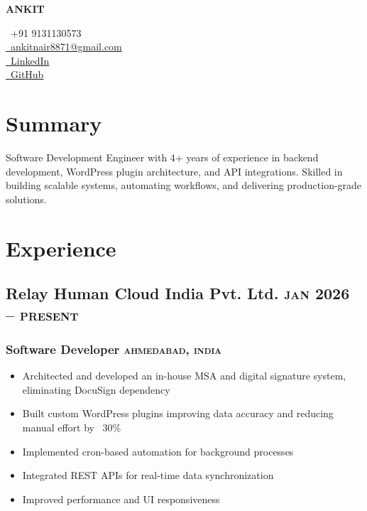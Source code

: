 \documentclass{article}
\newcommand{\rside}[1]{\hfill \normalfont\scshape\MakeLowercase{#1}}
\begin{document}
\begin{center}
  \begin{minipage}{0.6\textwidth}
    {\Huge\bfseries ANKIT}
  \end{minipage}\hfill
  \begin{minipage}{0.38\textwidth}
    \faPhone\ +91 9131130573 \\
    \href{mailto:ankitnair8871@gmail.com}{\faEnvelope\ ankitnair8871@gmail.com} \\
    \href{https://www.linkedin.com/in/ankit-nair-a57414187}{\faLinkedin\ LinkedIn} \\
    \href{https://github.com/ankit8871261605}{\faGithub\ GitHub}
  \end{minipage}
\end{center}

\section{\faUser\enspace Summary}
Software Development Engineer with 4+ years of experience in backend development, WordPress plugin architecture, and API integrations. Skilled in building scalable systems, automating workflows, and delivering production-grade solutions.

\section{\faChartPie\enspace Experience}

\subsection{Relay Human Cloud India Pvt. Ltd. \rside{Jan 2026 -- Present}}
\subsubsection{Software Developer \rside{Ahmedabad, India}}
\begin{itemize}
\item Architected and developed an in-house MSA and digital signature system, eliminating DocuSign dependency
\item Built custom WordPress plugins improving data accuracy and reducing manual effort by ~30\%
\item Implemented cron-based automation for background processes
\item Integrated REST APIs for real-time data synchronization
\item Improved performance and UI responsiveness
\end{itemize}
\end{document}
